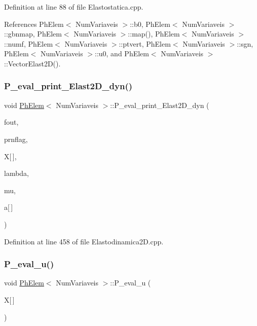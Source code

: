 Definition at line 88 of file Elastostatica.\+cpp.



References Ph\+Elem$<$ Num\+Variaveis $>$\+::b0, Ph\+Elem$<$ Num\+Variaveis $>$\+::gbnmap, Ph\+Elem$<$ Num\+Variaveis $>$\+::map(), Ph\+Elem$<$ Num\+Variaveis $>$\+::numf, Ph\+Elem$<$ Num\+Variaveis $>$\+::ptvert, Ph\+Elem$<$ Num\+Variaveis $>$\+::sgn, Ph\+Elem$<$ Num\+Variaveis $>$\+::u0, and Ph\+Elem$<$ Num\+Variaveis $>$\+::\+Vector\+Elast2\+D().

\mbox{\label{classPhElem_a467c1ae6065913d0ec9828c9d055539a}} 
\subsubsection{\texorpdfstring{P\+\_\+eval\+\_\+print\+\_\+\+Elast2\+D\+\_\+dyn()}{P\_eval\_print\_Elast2D\_dyn()}}
{\footnotesize\ttfamily void \hyperlink{classPhElem}{Ph\+Elem}$<$ Num\+Variaveis $>$\+::P\+\_\+eval\+\_\+print\+\_\+\+Elast2\+D\+\_\+dyn (\begin{DoxyParamCaption}\item[{F\+I\+LE $\ast$}]{fout,  }\item[{const int \&}]{prnflag,  }\item[{const double}]{X\mbox{[}$\,$\mbox{]},  }\item[{double}]{lambda,  }\item[{double}]{mu,  }\item[{const double}]{a\mbox{[}$\,$\mbox{]} }\end{DoxyParamCaption})\hspace{0.3cm}{\ttfamily [inherited]}}



Definition at line 458 of file Elastodinamica2\+D.\+cpp.

\mbox{\label{classPhElem_acd85a3728b9566c086c1450a35e6231f}} 
\subsubsection{\texorpdfstring{P\+\_\+eval\+\_\+u()}{P\_eval\_u()}\hspace{0.1cm}{\footnotesize\ttfamily [1/2]}}
{\footnotesize\ttfamily void \hyperlink{classPhElem}{Ph\+Elem}$<$ Num\+Variaveis $>$\+::P\+\_\+eval\+\_\+u (\begin{DoxyParamCaption}\item[{const double}]{X\mbox{[}$\,$\mbox{]} }\end{DoxyParamCaption})\hspace{0.3cm}{\ttfamily [inherited]}}

